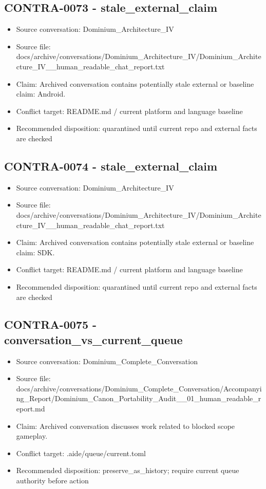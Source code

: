 \documentclass[11pt,a4paper]{report}
\begin{document}
\subsection{CONTRA-0073 - stale\_external\_claim}

\begin{itemize}
\item Source conversation: Dominium\_Architecture\_IV
\item Source file: docs/archive/conversations/Dominium\_Architecture\_IV/Dominium\_Architecture\_IV\_\_human\_readable\_chat\_report.txt
\item Claim: Archived conversation contains potentially stale external or baseline claim: Android.
\item Conflict target: README.md / current platform and language baseline
\item Recommended disposition: quarantined until current repo and external facts are checked
\end{itemize}

\subsection{CONTRA-0074 - stale\_external\_claim}

\begin{itemize}
\item Source conversation: Dominium\_Architecture\_IV
\item Source file: docs/archive/conversations/Dominium\_Architecture\_IV/Dominium\_Architecture\_IV\_\_human\_readable\_chat\_report.txt
\item Claim: Archived conversation contains potentially stale external or baseline claim: SDK.
\item Conflict target: README.md / current platform and language baseline
\item Recommended disposition: quarantined until current repo and external facts are checked
\end{itemize}

\subsection{CONTRA-0075 - conversation\_vs\_current\_queue}

\begin{itemize}
\item Source conversation: Dominium\_Complete\_Conversation
\item Source file: docs/archive/conversations/Dominium\_Complete\_Conversation/Accompanying\_Report/Dominium\_Canon\_Portability\_Audit\_\_01\_human\_readable\_report.md
\item Claim: Archived conversation discusses work related to blocked scope gameplay.
\item Conflict target: .aide/queue/current.toml
\item Recommended disposition: preserve\_as\_history; require current queue authority before action
\end{itemize}
\end{document}
